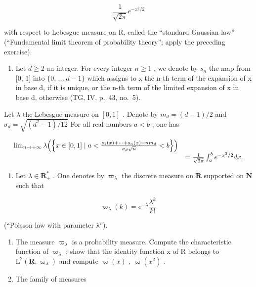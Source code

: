 \[
\frac {1}{\sqrt {2 \pi}} e ^ {- x ^ {2} / 2}
\]

with respect to Lebesgue measure on R, called the “standard Gaussian law” (“Fundamental limit theorem of probability theory”; apply the preceding exercise).

\begin{enumerate}
\def\labelenumi{\alph{enumi})}
\setcounter{enumi}{2}
\tightlist
\item
  Let \(d \geqslant 2\) an integer. For every integer \(n \geqslant 1\) , we denote by \(s_{n}\) the map from {[}0, 1{]} into \(\{0, \ldots, d - 1\}\) which assigns to x the n-th term of the expansion of x in base d, if it is unique, or the n-th term of the limited expansion of x in base d, otherwise (TG, IV, p.~43, no.~5).
\end{enumerate}

Let \(\lambda\) the Lebesgue measure on \([0,1]\) . Denote by \(m_d = (d - 1)/2\) and \(\sigma_d = \sqrt{(d^2 - 1)/12}\) For all real numbers \(a < b\) , one has

\[
\begin{array}{r l} \lim _ {n \to + \infty} \lambda \Big (\Big \{x \in [ 0, 1 ] \mid a <   \frac {s _ {1} (x) + \cdots + s _ {n} (x) - n m _ {d}}{\sigma_ {d} \sqrt {n}} <   b \Big \} \Big) \\ & = \frac {1}{\sqrt {2 \pi}} \int_ {a} ^ {b} e ^ {- x ^ {2} / 2} d x. \end{array}
\]

\begin{enumerate}
\def\labelenumi{\arabic{enumi})}
\setcounter{enumi}{40}
\tightlist
\item
  Let \(\lambda \in \mathbf{R}_{+}^{*}\) . One denotes by \(\varpi_{\lambda}\) the discrete measure on \(\mathbf{R}\) supported on \(\mathbf{N}\) such that
\end{enumerate}

\[
\varpi_ {\lambda} (k) = e ^ {- \lambda} \frac {\lambda^ {k}}{k !}
\]

(“Poisson law with parameter λ”).

\begin{enumerate}
\def\labelenumi{\alph{enumi})}
\item
  The measure \(\varpi_{\lambda}\) is a probability measure. Compute the characteristic function of \(\varpi_{\lambda}\) ; show that the identity function x of R belongs to \(\mathrm{L}^{2}(\mathbf{R},\varpi_{\lambda})\) and compute \(\varpi(x)\) , \(\varpi(x^{2})\) .
\item
  The family of measures
\end{enumerate}

